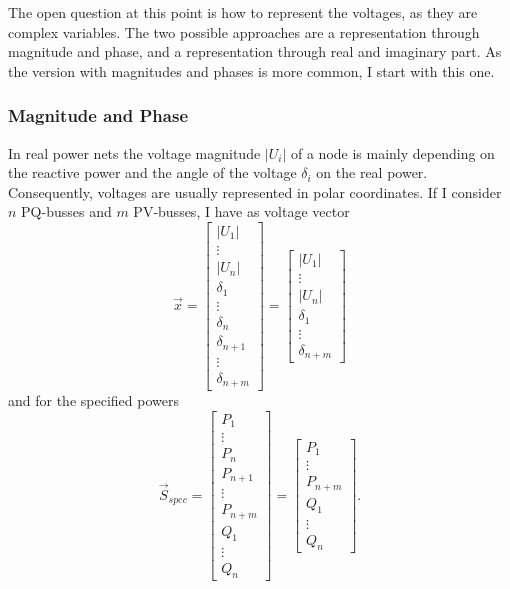 The open question at this point is how to represent the voltages, as they are complex variables. The two possible approaches are a representation through magnitude and phase, and a representation through real and imaginary part. As the version with magnitudes and phases is more common, I start with this one.

\subsubsection{Magnitude and Phase}
In real power nets the voltage magnitude $|U_i|$ of a node is mainly depending on the reactive power and the angle of the voltage $\delta_i$ on the real power. Consequently, voltages are usually represented in polar coordinates. If I consider $n$ PQ-busses and $m$ PV-busses, I have as voltage vector 
\begin{equation}
	\vec x = 
	\begin{bmatrix}
		|U_1| \\
		\vdots \\
		|U_n| \\
		\delta_1 \\
		\vdots \\
		\delta_n \\
		\delta_{n + 1} \\
		\vdots \\
		\delta_{n + m} 
	\end{bmatrix} = 	
	\begin{bmatrix}
		|U_1| \\
		\vdots \\
		|U_n| \\
		\delta_1 \\
		\vdots \\
		\delta_{n + m} 
	\end{bmatrix}
\end{equation}
and for the specified powers
\begin{equation}
	\vec S_{spec} = 
	\begin{bmatrix}
		P_1 \\
		\vdots \\
		P_n \\
		P_{n + 1} \\
		\vdots \\
		P_{n + m} \\
		Q_1 \\
		\vdots \\
		Q_n
	\end{bmatrix} = 
	\begin{bmatrix}
		P_1 \\
		\vdots \\
		P_{n + m} \\
		Q_1 \\
		\vdots \\
		Q_n
	\end{bmatrix}.
\end{equation}

